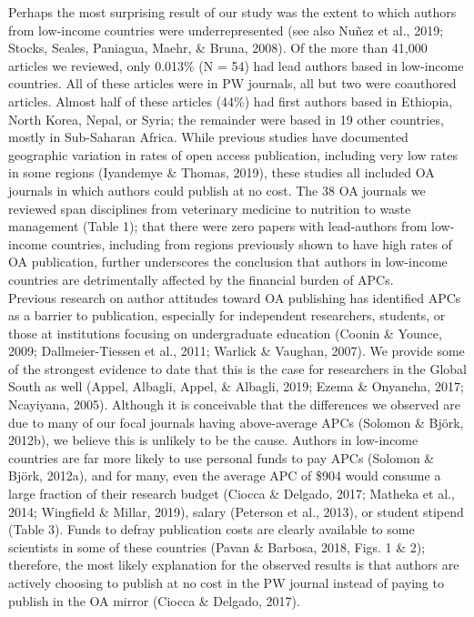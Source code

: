\documentclass[
  english,
  man]{apa6}
\begin{document}
Perhaps the most surprising result of our study was the extent to which authors from low-income countries were underrepresented (see also Nuñez et al., 2019; Stocks, Seales, Paniagua, Maehr, \& Bruna, 2008). Of the more than 41,000 articles we reviewed, only 0.013\% (N = 54) had lead authors based in low-income countries. All of these articles were in PW journals, all but two were coauthored articles. Almost half of these articles (44\%) had first authors based in Ethiopia, North Korea, Nepal, or Syria; the remainder were based in 19 other countries, mostly in Sub-Saharan Africa. While previous studies have documented geographic variation in rates of open access publication, including very low rates in some regions (Iyandemye \& Thomas, 2019), these studies all included OA journals in which authors could publish at no cost. The 38 OA journals we reviewed span disciplines from veterinary medicine to nutrition to waste management (Table 1); that there were zero papers with lead-authors from low-income countries, including from regions previously shown to have high rates of OA publication, further underscores the conclusion that authors in low-income countries are detrimentally affected by the financial burden of APCs.\\
Previous research on author attitudes toward OA publishing has identified APCs as a barrier to publication, especially for independent researchers, students, or those at institutions focusing on undergraduate education (Coonin \& Younce, 2009; Dallmeier-Tiessen et al., 2011; Warlick \& Vaughan, 2007). We provide some of the strongest evidence to date that this is the case for researchers in the Global South as well (Appel, Albagli, Appel, \& Albagli, 2019; Ezema \& Onyancha, 2017; Ncayiyana, 2005). Although it is conceivable that the differences we observed are due to many of our focal journals having above-average APCs (Solomon \& Björk, 2012b), we believe this is unlikely to be the cause. Authors in low-income countries are far more likely to use personal funds to pay APCs (Solomon \& Björk, 2012a), and for many, even the average APC of \$904 would consume a large fraction of their research budget (Ciocca \& Delgado, 2017; Matheka et al., 2014; Wingfield \& Millar, 2019), salary (Peterson et al., 2013), or student stipend (Table 3). Funds to defray publication costs are clearly available to some scientists in some of these countries (Pavan \& Barbosa, 2018, Figs. 1 \& 2); therefore, the most likely explanation for the observed results is that authors are actively choosing to publish at no cost in the PW journal instead of paying to publish in the OA mirror (Ciocca \& Delgado, 2017).\\
\end{document}
